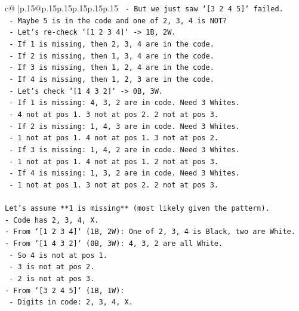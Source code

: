 \documentclass{article}
\begin{document}
{\begin{supertabular}{c@{$\;$}|p{.15\linewidth}@{}p{.15\linewidth}p{.15\linewidth}p{.15\linewidth}p{.15\linewidth}p{.15\linewidth}}
{{{\texttt{  {-} But we just saw `{[}3 2 4 5{]}` failed.} \\
\texttt{  {-} Maybe 5 is in the code and one of 2, 3, 4 is NOT?} \\
\texttt{  {-} Let's re{-}check `{[}1 2 3 4{]}` {-}> 1B, 2W.} \\
\texttt{    {-} If 1 is missing, then 2, 3, 4 are in the code.} \\
\texttt{    {-} If 2 is missing, then 1, 3, 4 are in the code.} \\
\texttt{    {-} If 3 is missing, then 1, 2, 4 are in the code.} \\
\texttt{    {-} If 4 is missing, then 1, 2, 3 are in the code.} \\
\texttt{  {-} Let's check `{[}1 4 3 2{]}` {-}> 0B, 3W.} \\
\texttt{    {-} If 1 is missing: 4, 3, 2 are in code. Need 3 Whites.} \\
\texttt{      {-} 4 not at pos 1. 3 not at pos 2. 2 not at pos 3.} \\
\texttt{    {-} If 2 is missing: 1, 4, 3 are in code. Need 3 Whites.} \\
\texttt{      {-} 1 not at pos 1. 4 not at pos 1. 3 not at pos 2.} \\
\texttt{    {-} If 3 is missing: 1, 4, 2 are in code. Need 3 Whites.} \\
\texttt{      {-} 1 not at pos 1. 4 not at pos 1. 2 not at pos 3.} \\
\texttt{    {-} If 4 is missing: 1, 3, 2 are in code. Need 3 Whites.} \\
\texttt{      {-} 1 not at pos 1. 3 not at pos 2. 2 not at pos 3.} \\
\\ 
\texttt{Let's assume **1 is missing** (most likely given the pattern).} \\
\texttt{{-} Code has 2, 3, 4, X.} \\
\texttt{{-} From `{[}1 2 3 4{]}` (1B, 2W): One of 2, 3, 4 is Black, two are White.} \\
\texttt{{-} From `{[}1 4 3 2{]}` (0B, 3W): 4, 3, 2 are all White.} \\
\texttt{  {-} So 4 is not at pos 1.} \\
\texttt{  {-} 3 is not at pos 2.} \\
\texttt{  {-} 2 is not at pos 3.} \\
\texttt{{-} From `{[}3 2 4 5{]}` (1B, 1W):} \\
\texttt{  {-} Digits in code: 2, 3, 4, X.} \\
}}}
\end{supertabular}}
\end{document}
